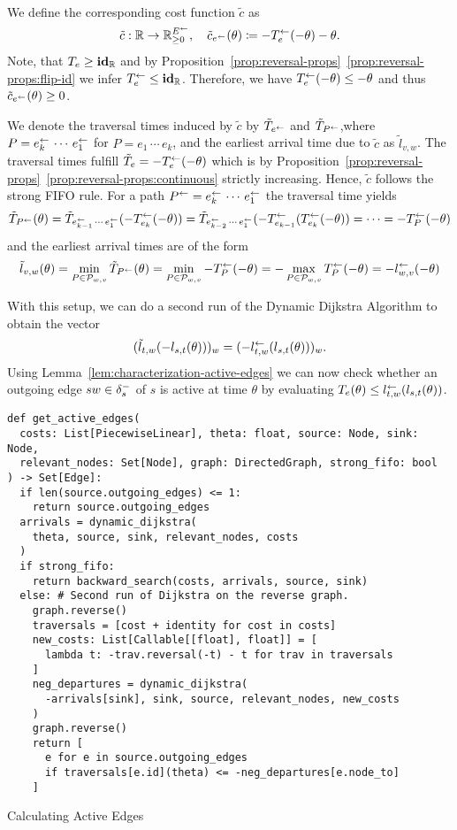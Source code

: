 We define the corresponding cost function $\tilde c$ as \[
    \tilde c : \mathbb{R} \rightarrow \mathbb{R}_{\geq0}^{E^{\leftarrow}}, \quad
    \tilde c_{e^{\leftarrow}}(\theta) \coloneqq - T_e^{\leftarrow}(-\theta) - \theta.
\]
Note, that $T_e  \geq \mathbf{id}_{\mathbb{R}}$ and by Proposition~\ref{prop:reversal-props}~\ref{prop:reversal-props:flip-id} we infer $T_e^{\leftarrow} \leq \mathbf{id}_{\mathbb{R}}$.
Therefore, we have $T_e^{\leftarrow}(-\theta) \leq -\theta$ and thus $\tilde c_{e^{\leftarrow}}(\theta) \geq 0$.

We denote the traversal times induced by $\tilde c$ by $\tilde T_{e^{\leftarrow}}$ and $\tilde T_{P^{\leftarrow}}$,where $P = e_k^{\leftarrow} \, \cdots \, e_1^{\leftarrow}$ for $P = e_1\,\cdots\, e_k$,
and the earliest arrival time due to $\tilde c$ as $\tilde l_{v,w}$.
The traversal times fulfill $\tilde T_e = -T_e^{\leftarrow}(-\theta)$ which is by Proposition~\ref{prop:reversal-props}~\ref{prop:reversal-props:continuous} strictly increasing.
Hence, $\tilde c$ follows the strong FIFO rule.
For a path $P^{\leftarrow} = e_k^{\leftarrow}\,\cdots\, e_1^{\leftarrow}$ the traversal time yields
\[
    \tilde T_{P^{\leftarrow}} (\theta)
    = \tilde T_{e_{k-1}^{\leftarrow}\,\cdots\,e_1^{\leftarrow}}(- T_{e_k}^{\leftarrow} ( - \theta ))
    = \tilde T_{e_{k-2}^{\leftarrow}\,\cdots\,e_1^{\leftarrow}}(-T_{e_{k-1}}^{\leftarrow} (T_{e_k}^{\leftarrow} ( - \theta ))
    = \cdots
    = - T_P^{\leftarrow}(-\theta)
\]
and the earliest arrival times are of the form
\[
    \tilde l_{v,w}(\theta)
    = \min_{P\in\mathcal{P}_{w,v}} \tilde T_{P^{\leftarrow}}(\theta)
    = \min_{P\in\mathcal{P}_{w,v}} - T_P^{\leftarrow}(-\theta)
    = - \max_{P\in\mathcal{P}_{w,v}} T_P^{\leftarrow}(-\theta)
    = - l_{w,v}^{\leftarrow}(-\theta)
\]

With this setup, we can do a second run of the Dynamic Dijkstra Algorithm to obtain the vector \[
    (\tilde l_{t,w}( - l_{s,t}(\theta) ))_w = (- l_{t,w}^{\leftarrow}( l_{s,t}(\theta) ))_w.
\]
Using Lemma~\ref{lem:characterization-active-edges} we can now check whether an outgoing edge $sw\in\delta^-_{s}$ of $s$ is active at time $\theta$ by evaluating $T_e(\theta) \leq l_{t,w}^{\leftarrow}( l_{s,t}(\theta))$.

\begin{algorithm}[h]
    \begin{verbatim}
def get_active_edges(
  costs: List[PiecewiseLinear], theta: float, source: Node, sink: Node,
  relevant_nodes: Set[Node], graph: DirectedGraph, strong_fifo: bool
) -> Set[Edge]:
  if len(source.outgoing_edges) <= 1:
    return source.outgoing_edges
  arrivals = dynamic_dijkstra(
    theta, source, sink, relevant_nodes, costs
  )
  if strong_fifo:
    return backward_search(costs, arrivals, source, sink)
  else: # Second run of Dijkstra on the reverse graph.
    graph.reverse()
    traversals = [cost + identity for cost in costs]
    new_costs: List[Callable[[float], float]] = [
      lambda t: -trav.reversal(-t) - t for trav in traversals
    ]
    neg_departures = dynamic_dijkstra(
      -arrivals[sink], sink, source, relevant_nodes, new_costs
    )
    graph.reverse()
    return [
      e for e in source.outgoing_edges
      if traversals[e.id](theta) <= -neg_departures[e.node_to]
    ]
  \end{verbatim}
  \caption{Calculating Active Edges}
  \label{alg:calculate-active-edges}
\end{algorithm}


